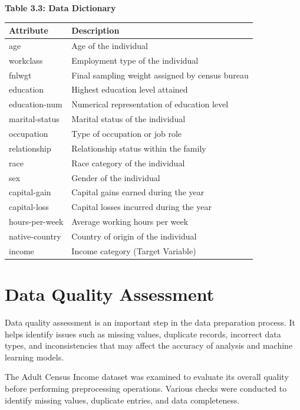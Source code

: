 \documentclass[12pt,a4paper]{report}
\begin{document}
\vspace{1cm}
\begin{center}
\small
\textbf{Table 3.3: Data Dictionary}
\vspace{0.65cm}
\begin{tabular}{|p{3cm}|p{8cm}|}
\hline
\textbf{Attribute} & \textbf{Description} \\
\hline
age & Age of the individual \\
\hline
workclass & Employment type of the individual \\
\hline
fnlwgt & Final sampling weight assigned by census bureau \\
\hline
education & Highest education level attained \\
\hline
education-num & Numerical representation of education level \\
\hline
marital-status & Marital status of the individual \\
\hline
occupation & Type of occupation or job role \\
\hline
relationship & Relationship status within the family \\
\hline
race & Race category of the individual \\
\hline
sex & Gender of the individual \\
\hline
capital-gain & Capital gains earned during the year \\
\hline
capital-loss & Capital losses incurred during the year \\
\hline
hours-per-week & Average working hours per week \\
\hline
native-country & Country of origin of the individual \\
\hline
income & Income category (Target Variable) \\
\hline
\end{tabular}
\end{center}
\vspace{1cm}

\section{Data Quality Assessment}

Data quality assessment is an important step in the data preparation process. It helps identify issues such as missing values, duplicate records, incorrect data types, and inconsistencies that may affect the accuracy of analysis and machine learning models.

The Adult Census Income dataset was examined to evaluate its overall quality before performing preprocessing operations. Various checks were conducted to identify missing values, duplicate entries, and data completeness.
\end{document}
